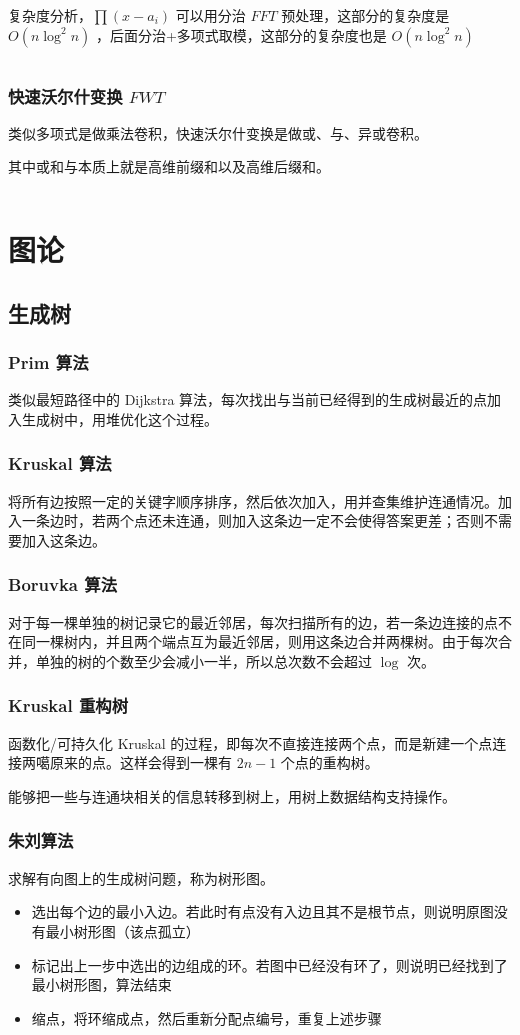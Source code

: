 \documentclass[UTF-8]{ctexart}
\newcommand{\cpp}[1]{\inputminted[bgcolor=bg,breaklines,breakanywhere=true]{c++}{#1}}
\begin{document}
			复杂度分析，$\prod (x-a_i)$ 可以用分治 $FFT$ 预处理，这部分的复杂度是$O(n\log^2n)$ ，后面分治+多项式取模，这部分的复杂度也是 $O(n\log^2n)$
			\cpp{code//Math//polyget.cpp}
			\subsubsection{快速沃尔什变换 $FWT$}
			类似多项式是做乘法卷积，快速沃尔什变换是做或、与、异或卷积。
			
			其中或和与本质上就是高维前缀和以及高维后缀和。
			\cpp{code//Math//fwt.cpp}
	\newpage
	\section{图论}
		\subsection{生成树}
			\subsubsection{Prim 算法}
			类似最短路径中的 Dijkstra 算法，每次找出与当前已经得到的生成树最近的点加入生成树中，用堆优化这个过程。
			\subsubsection{Kruskal 算法}
			将所有边按照一定的关键字顺序排序，然后依次加入，用并查集维护连通情况。加入一条边时，若两个点还未连通，则加入这条边一定不会使得答案更差；否则不需要加入这条边。
			\subsubsection{Boruvka 算法}
			对于每一棵单独的树记录它的最近邻居，每次扫描所有的边，若一条边连接的点不在同一棵树内，并且两个端点互为最近邻居，则用这条边合并两棵树。由于每次合并，单独的树的个数至少会减小一半，所以总次数不会超过 $\log$ 次。
			\subsubsection{Kruskal 重构树}
			函数化/可持久化 Kruskal 的过程，即每次不直接连接两个点，而是新建一个点连接两噶原来的点。这样会得到一棵有 $2n-1$ 个点的重构树。
			
			能够把一些与连通块相关的信息转移到树上，用树上数据结构支持操作。
			\subsubsection{朱刘算法}
			求解有向图上的生成树问题，称为树形图。
			\begin{itemize}
				\item 选出每个边的最小入边。若此时有点没有入边且其不是根节点，则说明原图没有最小树形图（该点孤立）
				\item 标记出上一步中选出的边组成的环。若图中已经没有环了，则说明已经找到了最小树形图，算法结束
				\item 缩点，将环缩成点，然后重新分配点编号，重复上述步骤
			\end{itemize}
			\cpp{code//Graph//mdst.cpp}
\end{document}
